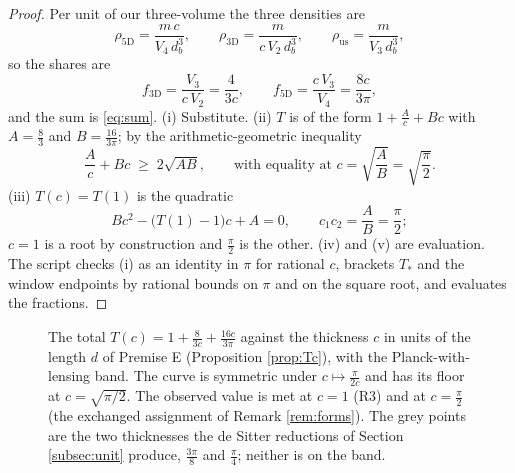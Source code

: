 \documentclass[11pt]{article}
\theoremstyle{definition}
\begin{document}
\begin{proof}
Per unit of our three-volume the three densities are
\[
\rho_{5\mathrm{D}} = \frac{m\,c}{V_{4}\,d_{b}^{3}}, \qquad
\rho_{3\mathrm{D}} = \frac{m}{c\,V_{2}\,d_{b}^{3}}, \qquad
\rho_{\mathrm{us}} = \frac{m}{V_{3}\,d_{b}^{3}},
\]
so the shares are
\[
f_{3\mathrm{D}} = \frac{V_{3}}{c\,V_{2}} = \frac{4}{3c}, \qquad f_{5\mathrm{D}} = \frac{c\,V_{3}}{V_{4}} = \frac{8c}{3\pi},
\]
and the sum is \eqref{eq:sum}. (i) Substitute. (ii) $T$ is of the form $1 + \frac{A}{c} + Bc$ with $A = \frac{8}{3}$ and $B = \frac{16}{3\pi}$; by the arithmetic-geometric inequality
\[
\frac{A}{c} + Bc \;\geq\; 2\sqrt{AB}, \qquad \text{with equality at } c = \sqrt{\frac{A}{B}} = \sqrt{\frac{\pi}{2}} .
\]
(iii) $T(c) = T(1)$ is the quadratic
\[
Bc^{2} - \bigl(T(1) - 1\bigr)c + A = 0, \qquad c_{1}c_{2} = \frac{A}{B} = \frac{\pi}{2};
\]
$c = 1$ is a root by construction and $\frac{\pi}{2}$ is the other. (iv) and (v) are evaluation. The script checks (i) as an identity in $\pi$ for rational $c$, brackets $T_{\ast}$ and the window endpoints by rational bounds on $\pi$ and on the square root, and evaluates the fractions.
\end{proof}

\begin{figure}[htbp]\centering
{}
\caption{The total $T(c) = 1 + \tfrac{8}{3c} + \tfrac{16c}{3\pi}$ against the thickness $c$ in units of the length $d$ of Premise E (Proposition \ref{prop:Tc}), with the Planck-with-lensing band. The curve is symmetric under $c \mapsto \tfrac{\pi}{2c}$ and has its floor at $c = \sqrt{\pi/2}$. The observed value is met at $c = 1$ (R3) and at $c = \tfrac{\pi}{2}$ (the exchanged assignment of Remark \ref{rem:forms}). The grey points are the two thicknesses the de Sitter reductions of Section \ref{subsec:unit} produce, $\tfrac{3\pi}{8}$ and $\tfrac{\pi}{4}$; neither is on the band.}
\label{fig:Tc}
\end{figure}
\end{document}

